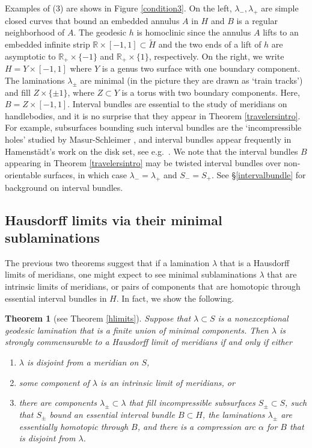 \documentclass[12pt]{amsart}
\newtheorem{theorem}{Theorem}[section] \newtheorem{philosophy}{Statement}[theorem]
\theoremstyle{definition}
\theoremstyle{remark}
\newcommand{\BR}{\mathbb R} \newcommand{\BD}{\mathbb D}
\begin{document}
Examples of (3) are shows in Figure \ref{condition3}. On the left, $\lambda_-,\lambda_+$ are simple closed curves that bound an embedded annulus $A$ in $H$ and $B$ is a regular neighborhood of $A$. The geodesic $h$ is homoclinic since the annulus $A$ lifts to an embedded infinite strip $\BR\times [-1,1]\subset \tilde H$ and the two ends of a lift of $h$ are asymptotic to $\BR_+ \times \{-1\}$ and $\BR_+ \times \{1\}$, respectively. On the right, we write $H=Y\times [-1,1]$ where $Y$ is a genus two surface with one boundary component. The laminations $\lambda_\pm$ are minimal (in the picture they are drawn as `train tracks') and fill $Z\times \{\pm 1\}$, where $Z\subset Y$ is a torus with two boundary components. Here, $B=Z\times [-1,1]$.
Interval bundles are essential to the study of meridians on handlebodies, and it is no surprise that they appear in Theorem \ref{travelersintro}. For example, subsurfaces bounding such interval bundles are the `incompressible holes' studied by Masur-Schleimer \cite{masur2013geometry}, and interval bundles appear frequently in Hamenst\"adt's work on the disk set, see e.g.\ \cite{hamenstadt2016hyperbolic,hamenstadt2019asymptoticI,hamenstadt2019asymptoticII}. We note that the interval bundles $B$ appearing in Theorem \ref{travelersintro} may be twisted interval bundles over non-orientable surfaces, in which case $\lambda_-=\lambda_+$ and $S_-=S_+$. See \S\ref{intervalbundle} for background on interval bundles.


\subsection{Hausdorff limits via their minimal sublaminations} The previous two theorems suggest that if a lamination $\lambda$ that is a Hausdorff limits of meridians, one might expect to see minimal sublaminations $\lambda$ that are intrinsic limits of meridians, or pairs of components that are homotopic through essential interval bundles in $H$. In fact, we show the following.

\begin{theorem}[see Theorem \ref{hlimits}]\label{hlimits2intro}
Suppose that $\lambda \subset S$ is a nonexceptional geodesic lamination that is a finite union of minimal components. Then $\lambda $ is strongly commensurable to a Hausdorff limit of meridians if and only if either
\begin{enumerate}
\item $\lambda$ is disjoint from a meridian on $S$,
\item some component of $\lambda $ is an intrinsic limit of meridians, or
\item there are components $\lambda_\pm \subset \lambda$ that fill incompressible subsurfaces $S_\pm \subset S$, such that $S_\pm$ bound an essential interval bundle $B\subset H$, the laminations $\lambda_\pm$ are essentially homotopic through $B$, and there is a compression arc $\alpha$ for $B$ that is disjoint from $\lambda $.
\end{enumerate}
\end{theorem}
\end{document}

